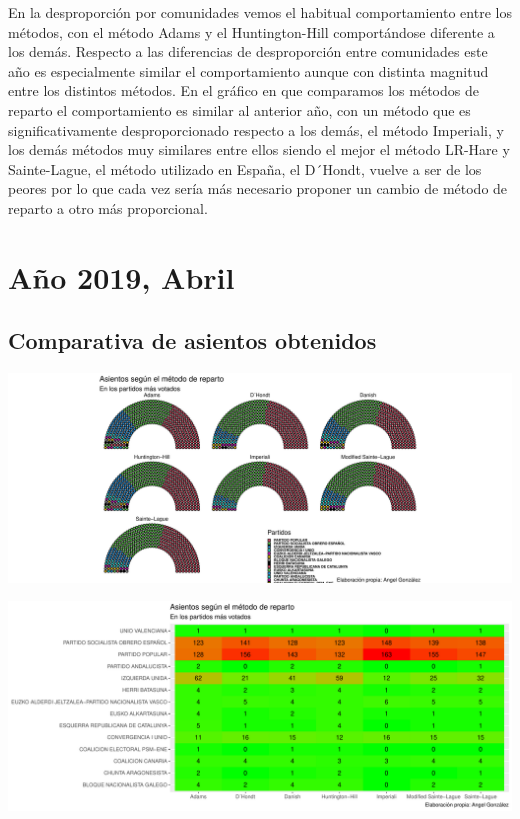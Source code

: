 \documentclass[12pt,a4paper,]{book}
\numberwithin{dummy}{section}
\theoremstyle{ocrenumbox}
\theoremstyle{blacknumex}
\theoremstyle{blacknumbox}
\theoremstyle{ocrenum}
\theoremstyle{ocrenum}
\begin{document}
En la desproporción por comunidades vemos el habitual comportamiento
entre los métodos, con el método Adams y el Huntington-Hill
comportándose diferente a los demás. Respecto a las diferencias de
desproporción entre comunidades este año es especialmente similar el
comportamiento aunque con distinta magnitud entre los distintos métodos.
En el gráfico en que comparamos los métodos de reparto el comportamiento
es similar al anterior año, con un método que es significativamente
desproporcionado respecto a los demás, el método Imperiali, y los demás
métodos muy similares entre ellos siendo el mejor el método LR-Hare y
Sainte-Lague, el método utilizado en España, el D´Hondt, vuelve a ser de
los peores por lo que cada vez sería más necesario proponer un cambio de
método de reparto a otro más proporcional.

\hypertarget{auxf1o-2019-abril}{%
\section{Año 2019, Abril}\label{auxf1o-2019-abril}}

\hypertarget{comparativa-de-asientos-obtenidos-13}{%
\subsection{Comparativa de asientos
obtenidos}\label{comparativa-de-asientos-obtenidos-13}}

\begin{center}\includegraphics[width=1\linewidth]{figurasR/unnamed-chunk-115-1} \end{center}

\begin{center}\includegraphics[width=1\linewidth]{figurasR/unnamed-chunk-115-2} \end{center}
\end{document}
